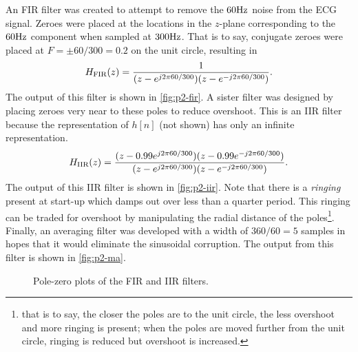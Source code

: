 \documentclass{ajhlabreport}
\begin{document}
An FIR filter was created to attempt to remove the $60\hertz$ noise from the ECG
signal. Zeroes were placed at the locations in the $z$-plane corresponding to the
$60\hertz$ component when sampled at $300\hertz$. That is to say, conjugate
zeroes were placed at $F = \pm 60/300=0.2$ on the unit circle, resulting in
\begin{align}
%
H_\text{FIR}(z) = \frac{1}{(z-e^{j 2\pi 60/300})(z-e^{-j 2\pi 60/300})}
\text.
\label{eq:p2-fir}
%
\end{align} The output of this filter is shown in \autoref{fig:p2-fir}. A sister
filter was designed by placing zeroes very near to these poles to reduce
overshoot. This is an IIR filter because the representation of $h[n]$ (not
shown) has only an infinite representation. \begin{align}
%
H_\text{IIR}(z) = \frac{(z - 0.99 e^{j 2\pi 60/300})(z - 0.99 e^{-j 2\pi 60/300})}{(z - e^{j 2\pi 60/300})(z - e^{-j 2\pi 60/300})}
\text.
\label{eq:p2-iir}
%
\end{align} The output of this IIR filter is shown in \autoref{fig:p2-iir}. Note
that there is a \emph{ringing} present at start-up which damps out over less
than a quarter period. This ringing can be traded for overshoot by manipulating
the radial distance of the poles\footnote{that is to say, the closer the poles
are to the unit circle, the less overshoot and more ringing is present; when the
poles are moved further from the unit circle, ringing is reduced but overshoot
is increased.}. Finally, an averaging filter was developed with a width of
$360/60=5$ samples in hopes that it would eliminate the sinusoidal corruption.
The output from this filter is shown in \autoref{fig:p2-ma}.

\begin{figure}[H]
\centering
{}
\caption{Pole-zero plots of the FIR and IIR filters.\label{fig:p2-pz}}
\end{figure}
\end{document}
